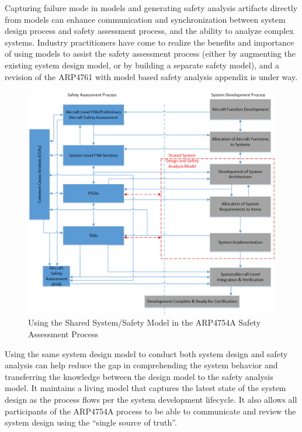 Capturing failure mode in models and generating safety analysis artifacts directly from models can enhance communication and synchronization between system design process and safety assessment process, and the ability to analyze complex systems. Industry practitioners have come to realize the benefits and importance of
using models to assist the safety assessment process (either by augmenting the existing system design model, or by building a separate safety model), and a revision of the ARP4761 with model based safety analysis appendix is under way.

\begin{figure}[h!]
	\vspace{-0.19in}
	\begin{center}
		\includegraphics[trim=0 9 0 5,clip,width=1.0\textwidth]{images/Safety_Assessment_Process_update.png}
	\end{center}
	\caption{Using the Shared System/Safety Model in the ARP4754A Safety Assessment Process}
	\label{fig:proposed_safety_process}
\end{figure}

Using the same system design model to conduct both system design and safety analysis can help reduce the gap in comprehending the system behavior and transferring the knowledge between the design model to the safety analysis model. It maintains a living model that captures the latest state of the system design as the process flows per the system development lifecycle.
It also allows all participants of the ARP4754A process to be able to communicate and review the system design using the ``single source of truth''.

